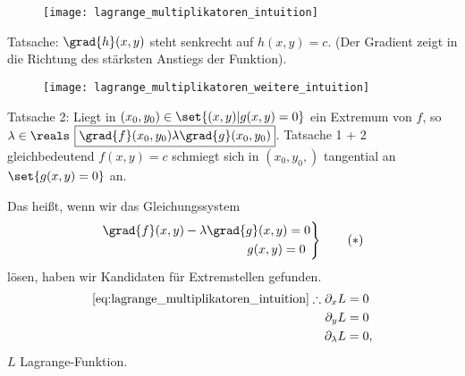 \begin{ergaenzung*}
  \begin{figure}[H]
    \centering
    \texttt{[image: lagrange\_multiplikatoren\_intuition]}
    \label{fig:lagrange_multiplikatoren_intuition}
  \end{figure}
  Tatsache: \( \grad{h}(x,y) \) steht senkrecht auf \( h(x,y)=c \). (Der Gradient zeigt in die Richtung des stärksten Anstiegs der Funktion).
  \begin{figure}[H]
    \centering
    \texttt{[image: lagrange\_multiplikatoren\_weitere\_intuition]}
    \label{fig:lagrange_multiplikatoren_weitere_intuition}
  \end{figure}
  Tatsache 2: Liegt in \( (x_0,y_0)\in \set{(x,y)|g(x,y)=0} \) ein Extremum von \( f \), so \texists \( \lambda\in \reals \) \sd \(\boxed{ \grad{f}(x_0,y_0)\lambda\grad{g}(x_0,y_0) }\). Tatsache 1 + 2 gleichbedeutend \( f(x,y)=c \) schmiegt sich in \( (x_0,y_0,) \) tangential an \( \set{g(x,y)=0} \) an.

  Das heißt, wenn wir das Gleichungssystem
  \begin{equation*}
    \left.\begin{aligned}
      \grad{f}(x,y)-\lambda\grad{g}(x,y&)=0\\
      g(x,y)&=0
    \end{aligned}\right\}\tag{\( * \)}\label{eq:lagrange_multiplikatoren_intuition}
  \end{equation*}
  lösen, haben wir Kandidaten für Extremstellen gefunden.
  \begin{align*}
    \eqref{eq:lagrange_multiplikatoren_intuition}\therefore \begin{aligned}[t]
      \partial_x L&=0\\
      \partial_y L&=0\\
      \partial_{\lambda} L&=0,
    \end{aligned}
  \end{align*}
  \( L \) Lagrange-Funktion.
\end{ergaenzung*}
